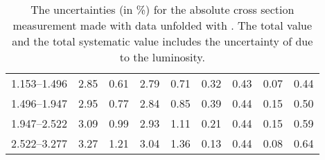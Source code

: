 \begin{table}
\begin{center}
\begin{tabular}{@{}l l l l l l l l l@{}}
            1.153--1.496    &  2.85   &  0.61   &  2.79         &  0.71      &  0.32    &  0.43  &  0.07       &  0.44  \\
            1.496--1.947    &  2.95   &  0.77   &  2.84         &  0.85      &  0.39    &  0.44  &  0.15       &  0.50  \\
            1.947--2.522    &  3.09   &  0.99   &  2.93         &  1.11      &  0.21    &  0.44  &  0.15       &  0.59  \\
            2.522--3.277    &  3.27   &  1.21   &  3.04         &  1.36      &  0.13    &  0.44  &  0.08       &  0.64  \\
            \bottomrule
        \end{tabular}
    \end{center}
    \caption[
        The uncertainties for the absolute cross section measurement made with
        data unfolded with \MADGRAPH.
    ]{
        The uncertainties (in \%) for the absolute cross section measurement
        made with data unfolded with \MADGRAPH. The total value and the total
        systematic value includes the uncertainty of \LumiUncertainty due to
        the luminosity.
    }
    \label{tab:sys_uncert_abs}
\end{table}
